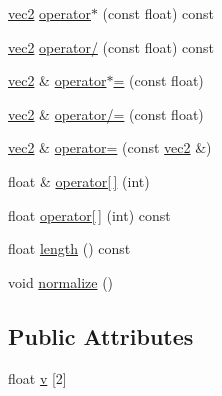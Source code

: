 \begin{DoxyCompactItemize}
\item 
\hyperlink{structvec2}{vec2} \hyperlink{structvec2_a92e02c3c972fadef2442cd8dcdfe422d}{operator$\ast$} (const float) const 
\item 
\hyperlink{structvec2}{vec2} \hyperlink{structvec2_a47810ee0188ae05307e8b73f9164448f}{operator/} (const float) const 
\item 
\hyperlink{structvec2}{vec2} \& \hyperlink{structvec2_a8710267eaba027c0988ae20d4846519a}{operator$\ast$=} (const float)
\item 
\hyperlink{structvec2}{vec2} \& \hyperlink{structvec2_a2f26ae992debbf688ceb7f433dc757be}{operator/=} (const float)
\item 
\hyperlink{structvec2}{vec2} \& \hyperlink{structvec2_ace53e3484dfb8cf4103c88f0e9fda9e1}{operator=} (const \hyperlink{structvec2}{vec2} \&)
\item 
float \& \hyperlink{structvec2_afd359b332fab435ac2404b7f85b225e0}{operator\mbox{[}$\,$\mbox{]}} (int)
\item 
float \hyperlink{structvec2_a0ffe1784bd89859e97498f09eecb371c}{operator\mbox{[}$\,$\mbox{]}} (int) const 
\item 
float \hyperlink{structvec2_a0858db6efbcc16f47e09de36711988ba}{length} () const 
\item 
void \hyperlink{structvec2_a4b8c6b2e6a7cb804e1cc4211edadbcfa}{normalize} ()
\end{DoxyCompactItemize}
\subsection*{Public Attributes}
\begin{DoxyCompactItemize}
\item 
float \hyperlink{structvec2_ae25758a321e69cf6f722589fca155735}{v} \mbox{[}2\mbox{]}
\end{DoxyCompactItemize}


